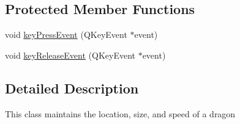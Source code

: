 \subsection*{\-Protected \-Member \-Functions}
\begin{DoxyCompactItemize}
\item 
void \hyperlink{classDragon_ad42c3caca52e0e086a9bb5e3daa038ab}{key\-Press\-Event} (\-Q\-Key\-Event $\ast$event)
\item 
void \hyperlink{classDragon_ae901577cb91d48fdb5e21c0680d3fbcb}{key\-Release\-Event} (\-Q\-Key\-Event $\ast$event)
\end{DoxyCompactItemize}


\subsection{\-Detailed \-Description}
\-This class maintains the location, size, and speed of a dragon 

